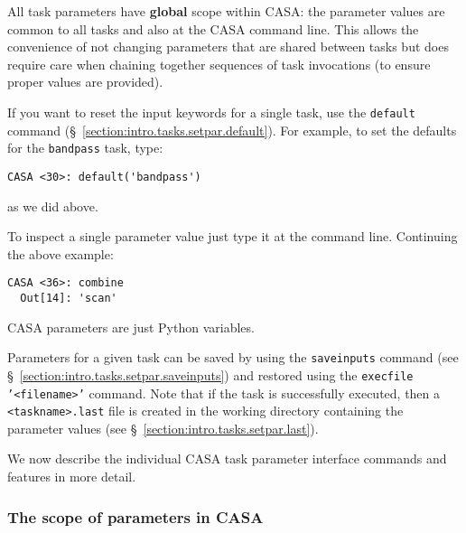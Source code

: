 
All task parameters have {\bf global} scope within CASA: the
parameter values are common to all tasks and also at the CASA command
line. This allows the convenience of not changing parameters that are
shared between tasks but does require care when chaining together
sequences of task invocations (to ensure proper values are provided).

If you want to reset the input keywords for a single task, use the
{\tt default} command (\S~\ref{section:intro.tasks.setpar.default}).  
For example, to set the defaults for the {\tt bandpass} task, type:
\small
\begin{verbatim}
CASA <30>: default('bandpass')
\end{verbatim}
\normalsize
as we did above.

To inspect a single parameter value just type it at the command line.
Continuing the above example:
\small
\begin{verbatim}
CASA <36>: combine
  Out[14]: 'scan'
\end{verbatim}
\normalsize
CASA parameters are just Python variables.

Parameters for a given task can be saved by using the {\tt saveinputs}
command (see \S~\ref{section:intro.tasks.setpar.saveinputs})
and restored using the {\tt execfile '<filename>'} command.  Note that
if the task is successfully executed, then a {\tt <taskname>.last}
file is created in the working directory containing the parameter
values (see \S~\ref{section:intro.tasks.setpar.last}).

We now describe the individual CASA task parameter interface commands
and features in more detail.

\subsubsection{The scope of parameters in CASA}
\label{section:intro.tasks.setpar.scope}

